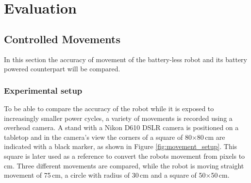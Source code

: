 \chapter{Evaluation}
\label{chp:evaluation}

\section{Controlled Movements}
\label{sec:controlled_movements}




In this section the accuracy of movement of the battery-less robot and its battery powered counterpart will be compared.

\subsection{Experimental setup}

To be able to compare the accuracy of the robot while it is exposed to increasingly smaller power cycles, a variety of movements is recorded using a overhead camera.
A stand with a Nikon D610 DSLR camera is positioned on a tabletop and in the camera's view the corners of a square of 80$\times$80\,cm are indicated with a black marker, as shown in Figure \ref{fig:movement_setup}.
This square is later used as a reference to convert the robots movement from pixels to cm.
Three different movements are compared, while the robot is moving straight movement of 75\,cm, a circle with radius of 30\,cm and a square of 50$\times$50\,cm.

